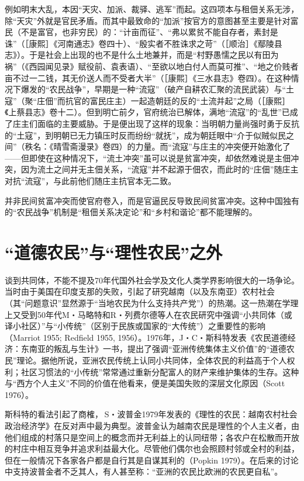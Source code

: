 \documentclass[a4paper,12pt,punct=kaiming,fontset=none]{ctexart}
\begin{document}
例如明末大乱，本因“天灾、加派、裁驿、逃军”而起。这四项本与租佃关系无涉，除“天灾”外就是官民矛盾。而其中最致命的“加派”按官方的意图甚至主要是针对富民（不是富官，也非穷民）的：“计亩而征”、“弗以累贫不能自存者，素封是诛”（［康熙］《河南通志》卷四十）、“殷实者不胜诛求之苛”（［顺治］《鄢陵县志》）。于是社会上出现的也不是什么土地兼并，而是“村野愚懦之民以有田为祸”（《西园闻见录》赋役前、袁表语）、“至欲以地白付人而莫可推”、“地之价贱者亩不过一二钱，其无价送人而不受者大半”（［康熙］《三水县志》卷四）。在这种情况下爆发的“农民战争”，早期是一种“流寇”（破产自耕农汇聚的流民武装）与“土寇”（聚“庄佃”而抗官的富民庄主）一起造朝廷的反的“土流并起”之局（［康熙］《上蔡县志》卷十二）。但到明亡前夕，官府统治已解体，满地“流寇”的“乱世”已成了庄主们面临的主要威胁。于是便出现了这样的现象：当明朝力量尚强时勇于反抗的“土寇”，到明朝已无力镇压时反而纷纷“就抚”，成为朝廷眼中“介于似贼似民之间”（秩名：《晴雪斋漫录》卷四）的力量。而“流寇”与庄主的冲突便开始激化了——但即使在这种情况下，“流土冲突”虽可以说是贫富冲突，却依然难说是主佃冲突，因为流土之间并无主佃关系，“流寇”并不起源于佃农，而此时的“庄佃”随庄主对抗“流寇”，与此前他们随庄主抗官本无二致。

并非民间贫富冲突而使官府卷入，而是官逼民反导致民间贫富冲突。这种中国独有的“农民战争”机制是“租佃关系决定论”和“乡村和谐论”都不能理解的。

\section*{“道德农民”与“理性农民”之外}

谈到共同体，不能不提及70年代国外社会学及文化人类学界影响很大的一场争论。当时由于美国在印度支那的失败，引起了研究越南（以及东南亚）农村社会（其“问题意识”显然源于“当地农民为什么支持共产党”）的热潮。这一热潮在学理上又受到50年代M・马略特和R・列费尔德等人在农民研究中强调“小共同体（或译小社区）”与“小传统”（区别于民族或国家的“大传统”）之重要性的影响（Marriot 1955; Redfield 1955, 1956）。1976年，J・C・斯科特发表《农民道德经济：东南亚的叛乱与生计》一书，提出了强调“亚洲传统集体主义价值”的“道德农民”理论。据他所说，亚洲农民传统上认同小共同体，全体农民的利益高于个人权利；社区习惯法的“小传统”常常通过重新分配富人的财产来维护集体的生存。这种与“西方个人主义”不同的价值在他看来，便是美国失败的深层文化原因（Scott 1976）。

斯科特的看法引起了商榷， S・波普金1979年发表的《理性的农民：越南农村社会政治经济学》在反对声中最为典型。波普金认为越南农民是理性的个人主义者，由他们组成的村落只是空间上的概念而并无利益上的认同纽带；各农户在松散而开放的村庄中相互竞争并追求利益最大化。尽管他们偶尔也会照顾村邻或全村的利益，但在一般情况下各家各户都是自行其是自谋其利的（Popkin 1979）。在后来的讨论中支持波普金者不乏其人，有人甚至称：“亚洲的农民比欧洲的农民更自私”。
\end{document}

